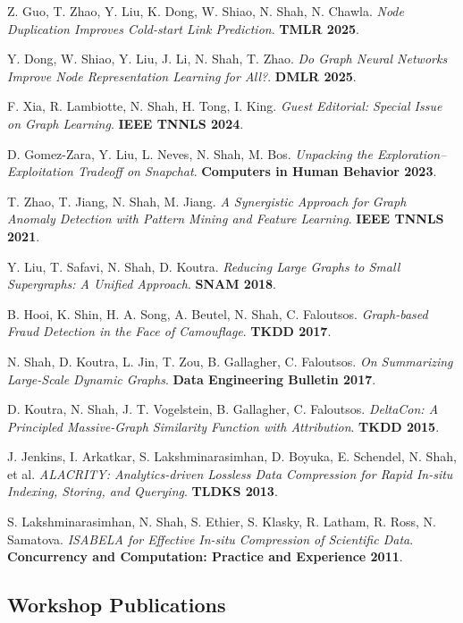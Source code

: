 \documentclass{article}
\begin{document}
\begin{etaremune}[itemsep=1pt,parsep=0pt]
\item Z. Guo, T. Zhao, Y. Liu, K. Dong, W. Shiao, N. Shah, N. Chawla. \emph{Node Duplication Improves Cold-start Link Prediction}. \textbf{TMLR 2025}.
\item Y. Dong, W. Shiao, Y. Liu, J. Li, N. Shah, T. Zhao. \emph{Do Graph Neural Networks Improve Node Representation Learning for All?}. \textbf{DMLR 2025}.
\item F. Xia, R. Lambiotte, N. Shah, H. Tong, I. King. \emph{Guest Editorial: Special Issue on Graph Learning}. \textbf{IEEE TNNLS 2024}.
\item D. Gomez-Zara, Y. Liu, L. Neves, N. Shah, M. Bos. \emph{Unpacking the Exploration–Exploitation Tradeoff on Snapchat}. \textbf{Computers in Human Behavior 2023}.
\item T. Zhao, T. Jiang, N. Shah, M. Jiang. \emph{A Synergistic Approach for Graph Anomaly Detection with Pattern Mining and Feature Learning}. \textbf{IEEE TNNLS 2021}.
\item Y. Liu, T. Safavi, N. Shah, D. Koutra. \emph{Reducing Large Graphs to Small Supergraphs: A Unified Approach}. \textbf{SNAM 2018}.
\item B. Hooi, K. Shin, H. A. Song, A. Beutel, N. Shah, C. Faloutsos. \emph{Graph-based Fraud Detection in the Face of Camouflage}. \textbf{TKDD 2017}.
\item N. Shah, D. Koutra, L. Jin, T. Zou, B. Gallagher, C. Faloutsos. \emph{On Summarizing Large-Scale Dynamic Graphs}. \textbf{Data Engineering Bulletin 2017}.
\item D. Koutra, N. Shah, J. T. Vogelstein, B. Gallagher, C. Faloutsos. \emph{DeltaCon: A Principled Massive-Graph Similarity Function with Attribution}. \textbf{TKDD 2015}.
\item J. Jenkins, I. Arkatkar, S. Lakshminarasimhan, D. Boyuka, E. Schendel, N. Shah, et al. \emph{ALACRITY: Analytics-driven Lossless Data Compression for Rapid In-situ Indexing, Storing, and Querying}. \textbf{TLDKS 2013}.
\item S. Lakshminarasimhan, N. Shah, S. Ethier, S. Klasky, R. Latham, R. Ross, N. Samatova. \emph{ISABELA for Effective In-situ Compression of Scientific Data}. \textbf{Concurrency and Computation: Practice and Experience 2011}.
\end{etaremune}

\subsection*{\bf {Workshop Publications}}
\end{document}
